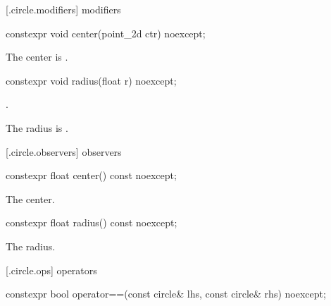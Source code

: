  [\iotwod.circle.modifiers]{ modifiers}

%
\begin{itemdecl}
constexpr void center(point_2d ctr) noexcept;
\end{itemdecl}

\begin{itemdescr}
\pnum
\effects
The center is .
\end{itemdescr}

%
\begin{itemdecl}
constexpr void radius(float r) noexcept;
\end{itemdecl}
\begin{itemdescr}
\requires
{}.

\pnum
\effects
The radius is .
\end{itemdescr}

 [\iotwod.circle.observers]{ observers}

%
\begin{itemdecl}
constexpr float center() const noexcept;
\end{itemdecl}
\begin{itemdescr}
\pnum
\returns
The center.
\end{itemdescr}

%
\begin{itemdecl}
constexpr float radius() const noexcept;
\end{itemdecl}
\begin{itemdescr}
\pnum
\returns
The radius.
\end{itemdescr}

 [\iotwod.circle.ops] { operators}

%
\begin{itemdecl}
constexpr bool operator==(const circle& lhs, const circle& rhs) noexcept;
\end{itemdecl}
\begin{itemdescr}
\pnum
\returns
{}
\end{itemdescr}
